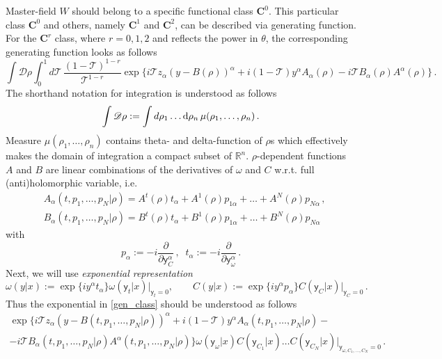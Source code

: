 \documentclass[12pt]{article}
\newcommand{\dr}{{{\rm d}}}
\newcommand{\go}{\omega}
\begin{document}
Master-field $W$ should belong to a specific functional class $\mathbf{C}^0$. 
This particular class $\mathbf{C}^0$ and others, namely $\mathbf{C}^1$ and $\mathbf{C}^2$, can be described via generating function. For the $\mathbf{C}^r$ class, where $r=0,1,2$ and reflects the power in $\theta$, the corresponding generating function looks as follows
\begin{equation}\label{gen_class}
\int \mathscr{D}\rho\int_0^1 d\mathcal{T}\, \frac{(1-\mathcal{T})^{1-r}}{\mathcal{T}^{1-r}}\exp\{i\mathcal{T}z_\alpha(y-B(\rho))^\alpha+i(1-\mathcal{T})y^\alpha A_\alpha(\rho)-i\mathcal{T}B_\alpha(\rho) A^\alpha(\rho)\}\,.
\end{equation}
The shorthand notation for integration is understood as follows
\begin{equation}\label{measure}
\int \mathscr{D}\rho:=\int d\rho_1\ldots \dr \rho_n\, \mu(\rho_1,\ldots,\rho_n)\,.
\end{equation}
Measure $\mu(\rho_1,\ldots,\rho_n)$ contains theta- and delta-function of $\rho$s which effectively makes the domain of integration a compact subset of $\mathbb{R}^n$. $\rho$-dependent functions $A$ and $B$ are linear combinations of the derivatives of $\omega$ and $C$ w.r.t. full (anti)holomorphic variable, i.e.
\begin{align}
&A_\alpha(t,p_1,\ldots,p_N|\rho)=A^t(\rho)t_\alpha+A^1(\rho)p_{1\alpha}+\ldots +A^N(\rho)p_{N\alpha}\,,\\
&B _\alpha(t,p_1,\ldots,p_N|\rho)=B^t(\rho)t_\alpha+B^1(\rho)p_{1\alpha}+\ldots +B^N(\rho)p_{N\alpha}\,
\end{align}
with
\begin{equation}
p_{\alpha}:=-i\frac{\partial}{\partial \mathsf{y}_{C}^\alpha}\,,\;\; t_\alpha:=-i\frac{\partial}{\partial \mathsf{y}_\go^\alpha}\,.
\end{equation}
Next, we will use {\it exponential representation}
\begin{equation}\label{exponential_form}
\omega(y|x) := \exp\{iy^\alpha t_\alpha\} \omega(\mathsf{y}_t|x) \big|_{\mathsf{y}_t=0}, \qquad C(y|x) := \exp\{iy^\alpha p_\alpha\} C(\mathsf{y}_C|x) \big|_{\mathsf{y}_C=0}\,.
\end{equation}
Thus the exponential in \eqref{gen_class} should be understood as follows
\begin{multline}
\exp\big\{i\mathcal{T} z_\alpha (y-B(t,p_1,\ldots,p_N|\rho))^\alpha+i(1-\mathcal{T})y^\alpha A_\alpha(t,p_1,\ldots,p_N|\rho)-\\
-i\mathcal{T} B_\alpha(t,p_1,\ldots,p_N|\rho)A^\alpha(t,p_1,\ldots,p_N|\rho)\big\}\go(\mathsf{y}_\go|x)C(\mathsf{y}_{C_1}|x)\ldots C(\mathsf{y}_{C_N}|x)\Big|_{\mathsf{y}_{\go, C_1,\ldots, C_N}=0}\,.
\end{multline}
\end{document}
